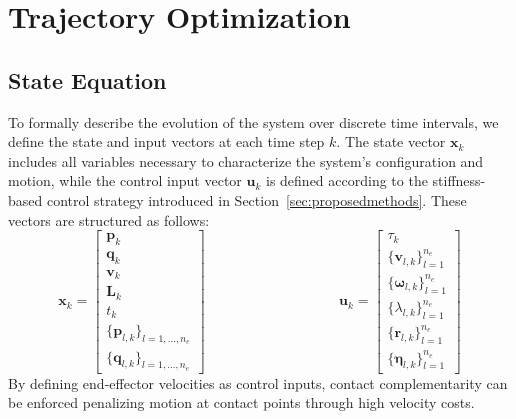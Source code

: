 \documentclass[main.tex]{subfiles}
\begin{document}
\begin{sloppypar}
\section{Trajectory Optimization}
\label{sec:formulation}
\subsection{State Equation}
To formally describe the evolution of the system over discrete time intervals, we define the state and input vectors at each time step \( k \). The state vector \( \mathbf{x}_k \) includes all variables necessary to characterize the system’s configuration and motion, while the control input vector \( \mathbf{u}_k \) is defined according to the stiffness-based control strategy introduced in Section~\ref{sec:proposedmethods}. These vectors are structured as follows:
\begin{equation}
\label{eq:state_input}
\mathbf{x}_k =
\begin{bmatrix}
\mathbf{p}_k \\
\mathbf{q}_k \\
\mathbf{v}_k \\
\mathbf{L}_k \\
t_k \\
\{\mathbf{p}_{l,k}\}_{l=1,\ldots,n_e} \\
\{\mathbf{q}_{l,k}\}_{l=1,\ldots,n_e}
\end{bmatrix}
\hspace{4cm}
\mathbf{u}_k =
\begin{bmatrix}
\tau_k \\
\{\mathbf{v}_{l,k}\}_{l=1}^{n_e} \\
\{\boldsymbol{\omega}_{l,k}\}_{l=1}^{n_e} \\
\{\lambda_{l,k}\}_{l=1}^{n_e} \\
\{\mathbf{r}_{l,k}\}_{l=1}^{n_e} \\
\{\boldsymbol{\eta}_{l,k}\}_{l=1}^{n_e}
\end{bmatrix}
\end{equation}
By defining end-effector velocities as control inputs, contact complementarity can be enforced penalizing motion at contact points through high velocity costs.

\end{sloppypar}
\end{document}
